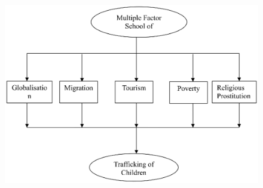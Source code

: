 \begin{figure}
\includegraphics[scale=1.1]{images/fig001.eps}
\end{figure}

\vspace{-.3cm}

\begin{multicols}{2}




\end{multicols}
\label{end2016-art5}
